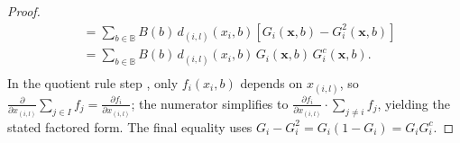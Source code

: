 \documentclass{article}
\begin{document}
\begin{proof}
\begin{align}
                    &=\sum_{b\in \mathbb{B}} B(b)\, d_{(i,l)}(x_i,b)\left[G_i(\mathbf{x},b)- G_i^2(\mathbf{x},b)\right] \\ %
                    &=\sum_{b\in \mathbb{B}} B(b)\, d_{(i,l)}(x_i,b)\, G_i(\mathbf{x},b)\,G_i^c(\mathbf{x},b). \\ %
                \end{align}
                In the quotient rule step , only $f_i(x_i,b)$ depends on $x_{(i,l)}$, so $\frac{\partial}{\partial x_{(i,l)}}\sum_{j\in I} f_j = \frac{\partial f_i}{\partial x_{(i,l)}}$; the numerator simplifies to $\frac{\partial f_i}{\partial x_{(i,l)}}\cdot\sum_{j\neq i} f_j$, yielding the stated factored form. The final equality uses $G_i - G_i^2 = G_i(1-G_i) = G_i G_i^c$.
            \end{proof}
            
\end{document}
